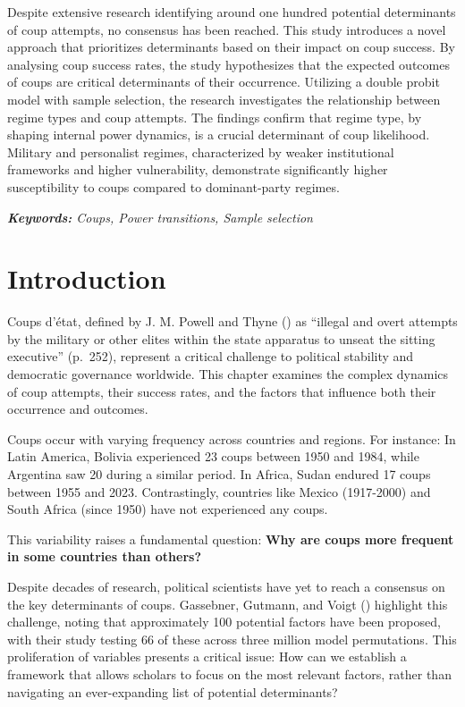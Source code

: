 \documentclass[
  12pt,
]{report}
\begin{document}
Despite extensive research identifying around one hundred potential
determinants of coup attempts, no consensus has been reached. This study
introduces a novel approach that prioritizes determinants based on their
impact on coup success. By analysing coup success rates, the study
hypothesizes that the expected outcomes of coups are critical
determinants of their occurrence. Utilizing a double probit model with
sample selection, the research investigates the relationship between
regime types and coup attempts. The findings confirm that regime type,
by shaping internal power dynamics, is a crucial determinant of coup
likelihood. Military and personalist regimes, characterized by weaker
institutional frameworks and higher vulnerability, demonstrate
significantly higher susceptibility to coups compared to dominant-party
regimes.

\emph{\textbf{Keywords:} Coups, Power transitions, Sample selection}

\newpage

\section{Introduction}\label{introduction-1}

Coups d'état, defined by J. M. Powell and Thyne
() as ``illegal and overt attempts by the
military or other elites within the state apparatus to unseat the
sitting executive'' (p.~252), represent a critical challenge to
political stability and democratic governance worldwide. This chapter
examines the complex dynamics of coup attempts, their success rates, and
the factors that influence both their occurrence and outcomes.

Coups occur with varying frequency across countries and regions. For
instance: In Latin America, Bolivia experienced 23 coups between 1950
and 1984, while Argentina saw 20 during a similar period. In Africa,
Sudan endured 17 coups between 1955 and 2023. Contrastingly, countries
like Mexico (1917-2000) and South Africa (since 1950) have not
experienced any coups.

This variability raises a fundamental question: \textbf{Why are coups
more frequent in some countries than others?}

Despite decades of research, political scientists have yet to reach a
consensus on the key determinants of coups. Gassebner, Gutmann, and
Voigt () highlight this challenge,
noting that approximately 100 potential factors have been proposed, with
their study testing 66 of these across three million model permutations.
This proliferation of variables presents a critical issue: How can we
establish a framework that allows scholars to focus on the most relevant
factors, rather than navigating an ever-expanding list of potential
determinants?
\end{document}
